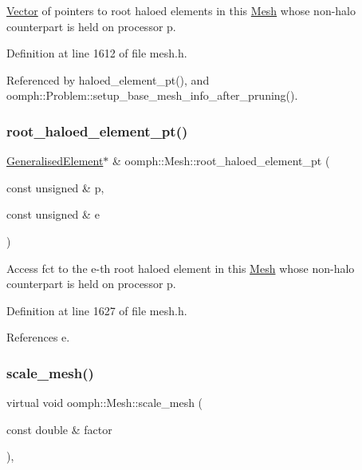 \hyperlink{classoomph_1_1Vector}{Vector} of pointers to root haloed elements in this \hyperlink{classoomph_1_1Mesh}{Mesh} whose non-\/halo counterpart is held on processor p. 



Definition at line 1612 of file mesh.\+h.



Referenced by haloed\+\_\+element\+\_\+pt(), and oomph\+::\+Problem\+::setup\+\_\+base\+\_\+mesh\+\_\+info\+\_\+after\+\_\+pruning().

\mbox{\label{classoomph_1_1Mesh_a9d69ded77ec61828d6615bab1bd133b3}} 
\subsubsection{\texorpdfstring{root\+\_\+haloed\+\_\+element\+\_\+pt()}{root\_haloed\_element\_pt()}\hspace{0.1cm}{\footnotesize\ttfamily [2/2]}}
{\footnotesize\ttfamily \hyperlink{classoomph_1_1GeneralisedElement}{Generalised\+Element}$\ast$ \& oomph\+::\+Mesh\+::root\+\_\+haloed\+\_\+element\+\_\+pt (\begin{DoxyParamCaption}\item[{const unsigned \&}]{p,  }\item[{const unsigned \&}]{e }\end{DoxyParamCaption})\hspace{0.3cm}{\ttfamily [inline]}}



Access fct to the e-\/th root haloed element in this \hyperlink{classoomph_1_1Mesh}{Mesh} whose non-\/halo counterpart is held on processor p. 



Definition at line 1627 of file mesh.\+h.



References e.

\mbox{\label{classoomph_1_1Mesh_a7e0d761fca70b856185b7b9b2168663d}} 
\subsubsection{\texorpdfstring{scale\+\_\+mesh()}{scale\_mesh()}}
{\footnotesize\ttfamily virtual void oomph\+::\+Mesh\+::scale\+\_\+mesh (\begin{DoxyParamCaption}\item[{const double \&}]{factor }\end{DoxyParamCaption})\hspace{0.3cm}{\ttfamily [inline]}, {\ttfamily [virtual]}}



